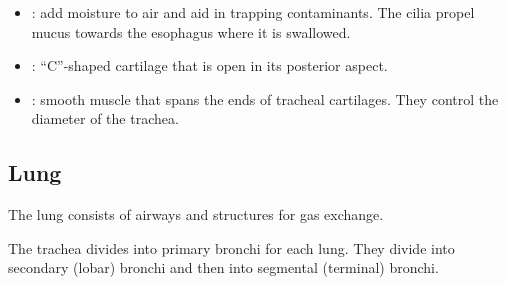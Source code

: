 \begin{multicols}{2}
\begin{itemize}
  \item {}: add moisture to air and aid in trapping contaminants. The cilia propel mucus towards the esophagus where it is swallowed.
  
  \begin{center}
  \end{center}
  
  \item {}: ``C''-shaped cartilage that is open in its posterior aspect.
  
  \begin{center}
  \end{center}
  
  \item {}: smooth muscle that spans the ends of tracheal cartilages. They control the diameter of the trachea.
  
  \begin{center}
  \end{center}
  
\end{itemize}
\end{multicols}

\vspace{30pt}

\subsection{Lung}
The lung consists of airways and structures for gas exchange.

The trachea divides into primary bronchi for each lung. They divide into secondary (lobar) bronchi and then into segmental (terminal) bronchi.

